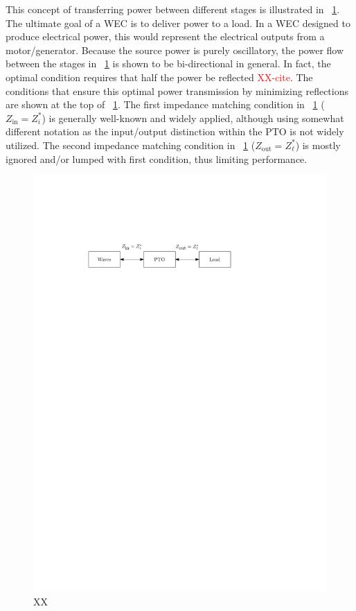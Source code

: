 \documentclass[lettersize,journal]{IEEEtran}
\newcommand{\rc}[1]{\textcolor{red}{#1}}
\begin{document}
This concept of transferring power between different stages is illustrated in \figurename~\ref{fig:wec_as_multiport_power_transfer_stages}.
The ultimate goal of a WEC is to deliver power to a load.
In a WEC designed to produce electrical power, this would represent the electrical outputs from a motor/generator.
Because the source power is purely oscillatory, the power flow between the stages in \figurename~\ref{fig:wec_as_multiport_power_transfer_stages} is shown to be bi-directional in general.
In fact, the optimal condition requires that half the power be reflected \rc{XX-cite}.
The conditions that ensure this optimal power transmission by minimizing reflections are shown at the top of \figurename~\ref{fig:wec_as_multiport_power_transfer_stages}.
The first impedance matching condition in \figurename~\ref{fig:wec_as_multiport_power_transfer_stages} ($Z_{\textrm{in}} = Z_i^*$) is generally well-known and widely applied, although using somewhat different notation as the input/output distinction within the PTO is not widely utilized.
The second impedance matching condition in \figurename~\ref{fig:wec_as_multiport_power_transfer_stages} ($Z_{\textrm{out}} = Z_\ell^*$) is mostly ignored and/or lumped with first condition, thus limiting performance.

\begin{figure}[tb]
        \centering
        \includegraphics[width=1\columnwidth]{wec_as_multiport_power_transfer_stages.pdf}
        \caption{XX}
        \label{fig:wec_as_multiport_power_transfer_stages}
\end{figure}
\end{document}
